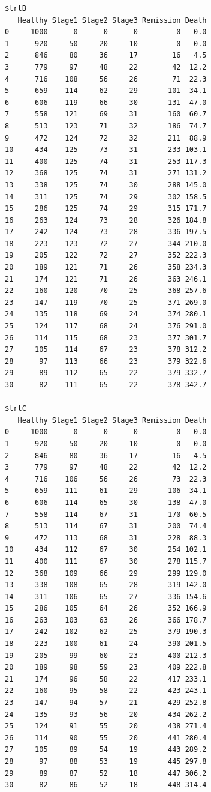 \documentclass[
  letterpaper,
  DIV=11,
  numbers=noendperiod,
  oneside]{scrartcl}
\begin{document}
\begin{verbatim}
$trtB
   Healthy Stage1 Stage2 Stage3 Remission Death
0     1000      0      0      0         0   0.0
1      920     50     20     10         0   0.0
2      846     80     36     17        16   4.5
3      779     97     48     22        42  12.2
4      716    108     56     26        71  22.3
5      659    114     62     29       101  34.1
6      606    119     66     30       131  47.0
7      558    121     69     31       160  60.7
8      513    123     71     32       186  74.7
9      472    124     72     32       211  88.9
10     434    125     73     31       233 103.1
11     400    125     74     31       253 117.3
12     368    125     74     31       271 131.2
13     338    125     74     30       288 145.0
14     311    125     74     29       302 158.5
15     286    125     74     29       315 171.7
16     263    124     73     28       326 184.8
17     242    124     73     28       336 197.5
18     223    123     72     27       344 210.0
19     205    122     72     27       352 222.3
20     189    121     71     26       358 234.3
21     174    121     71     26       363 246.1
22     160    120     70     25       368 257.6
23     147    119     70     25       371 269.0
24     135    118     69     24       374 280.1
25     124    117     68     24       376 291.0
26     114    115     68     23       377 301.7
27     105    114     67     23       378 312.2
28      97    113     66     23       379 322.6
29      89    112     65     22       379 332.7
30      82    111     65     22       378 342.7

$trtC
   Healthy Stage1 Stage2 Stage3 Remission Death
0     1000      0      0      0         0   0.0
1      920     50     20     10         0   0.0
2      846     80     36     17        16   4.5
3      779     97     48     22        42  12.2
4      716    106     56     26        73  22.3
5      659    111     61     29       106  34.1
6      606    114     65     30       138  47.0
7      558    114     67     31       170  60.5
8      513    114     67     31       200  74.4
9      472    113     68     31       228  88.3
10     434    112     67     30       254 102.1
11     400    111     67     30       278 115.7
12     368    109     66     29       299 129.0
13     338    108     65     28       319 142.0
14     311    106     65     27       336 154.6
15     286    105     64     26       352 166.9
16     263    103     63     26       366 178.7
17     242    102     62     25       379 190.3
18     223    100     61     24       390 201.5
19     205     99     60     23       400 212.3
20     189     98     59     23       409 222.8
21     174     96     58     22       417 233.1
22     160     95     58     22       423 243.1
23     147     94     57     21       429 252.8
24     135     93     56     20       434 262.2
25     124     91     55     20       438 271.4
26     114     90     55     20       441 280.4
27     105     89     54     19       443 289.2
28      97     88     53     19       445 297.8
29      89     87     52     18       447 306.2
30      82     86     52     18       448 314.4
\end{verbatim}
\end{document}
